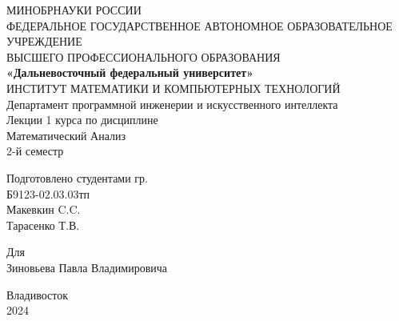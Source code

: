 \documentclass[12pt]{article}
\begin{document}
    \justifying
    \begin{titlepage}
        \begin{center}
            \hfill \break
            \large{МИНОБРНАУКИ РОССИИ}\\
            \footnotesize{ФЕДЕРАЛЬНОЕ ГОСУДАРСТВЕННОЕ АВТОНОМНОЕ ОБРАЗОВАТЕЛЬНОЕ УЧРЕЖДЕНИЕ}\\ 
            \footnotesize{ВЫСШЕГО ПРОФЕССИОНАЛЬНОГО ОБРАЗОВАНИЯ}\\
            \small{\textbf{«Дальневосточный федеральный университет»}}\\
            \hfill \break
            \normalsize{ИНСТИТУТ МАТЕМАТИКИ И КОМПЬЮТЕРНЫХ ТЕХНОЛОГИЙ}\\
             \hfill \break
            \normalsize{Департамент программной инженерии и искусственного интеллекта}\\
            \hfill\break
            \hfill \break
            \hfill \break
            \hfill \break
            \large{Лекции 1 курса по дисциплине}\\
            \large{Математический Анализ}\\
            \large{2-й семестр}\\
            \hfill \break
            \hfill \break
            \hfill \break
            \begin{flushright}
              Подготовлено студентами гр.\\
              Б9123-02.03.03тп\\
              Макевкин C.C.\\
              Тарасенко Т.В.\\
              \hfill \break
            \end{flushright}
            \begin{center}
                Для\\
              Зиновьева Павла Владимировича
            \end{center}
            \hfill \break
            
            \hfill \break
            
            \hfill \break
            \hfill \break
            \end{center}
             
            \hfill \break
             
            \normalsize{ 
            
            }
            \begin{center} Владивосток \\ 2024 \end{center}
            \thispagestyle{empty}
    \end{titlepage}
    \pagebreak
    \tableofcontents
    \pagebreak
\end{document}
